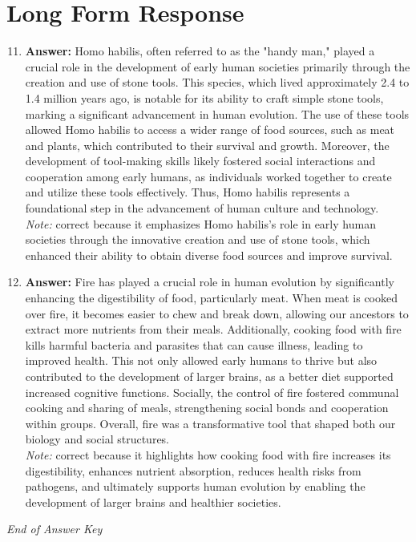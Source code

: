 \documentclass[12pt]{article}
\begin{document}
\section*{Long Form Response}
\begin{enumerate}[label=\arabic*.]
\setcounter{enumi}{10}
\item \textbf{Answer:} Homo habilis, often referred to as the "handy man," played a crucial role in the development of early human societies primarily through the creation and use of stone tools. This species, which lived approximately 2.4 to 1.4 million years ago, is notable for its ability to craft simple stone tools, marking a significant advancement in human evolution. The use of these tools allowed Homo habilis to access a wider range of food sources, such as meat and plants, which contributed to their survival and growth. Moreover, the development of tool-making skills likely fostered social interactions and cooperation among early humans, as individuals worked together to create and utilize these tools effectively. Thus, Homo habilis represents a foundational step in the advancement of human culture and technology.
\\ \textit{Note:} correct because it emphasizes Homo habilis's role in early human societies through the innovative creation and use of stone tools, which enhanced their ability to obtain diverse food sources and improve survival.
\item \textbf{Answer:} Fire has played a crucial role in human evolution by significantly enhancing the digestibility of food, particularly meat. When meat is cooked over fire, it becomes easier to chew and break down, allowing our ancestors to extract more nutrients from their meals. Additionally, cooking food with fire kills harmful bacteria and parasites that can cause illness, leading to improved health. This not only allowed early humans to thrive but also contributed to the development of larger brains, as a better diet supported increased cognitive functions. Socially, the control of fire fostered communal cooking and sharing of meals, strengthening social bonds and cooperation within groups. Overall, fire was a transformative tool that shaped both our biology and social structures.
\\ \textit{Note:} correct because it highlights how cooking food with fire increases its digestibility, enhances nutrient absorption, reduces health risks from pathogens, and ultimately supports human evolution by enabling the development of larger brains and healthier societies.
\end{enumerate}

\vfill
\noindent\textit{End of Answer Key}
\end{document}
